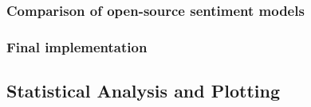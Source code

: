 \documentclass{report}
\begin{document}
\subsubsection{Comparison of open-source sentiment models} %




\subsubsection{Final implementation}


\subsection{Statistical Analysis and Plotting}




\end{document}
